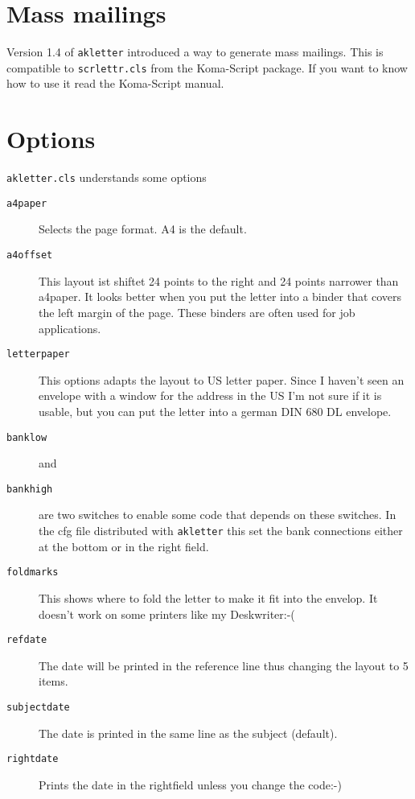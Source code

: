 \documentclass[a4paper]{article}
\begin{document}
\section{Mass mailings}

Version 1.4 of \texttt{akletter} introduced a way to generate 
mass mailings. This is compatible to \texttt{scrlettr.cls} from the 
Koma-Script package. If you want to know how to use it read the 
Koma-Script manual.

\section{Options}

\texttt{akletter.cls} understands some options

\begin{description}
\item [\texttt{a4paper}] Selects the page format. A4 is the default.

\item [\texttt{a4offset}] This layout ist shiftet 24 points to the 
right and 24 points narrower than a4paper. It looks better when you 
put the letter into a binder that covers the left margin of the page. 
These binders are often used for job applications.

\item [\texttt{letterpaper}] This options adapts the layout to US 
letter paper. Since I haven't seen an envelope with a window for the 
address in the US I'm not sure if it is usable, but you can put the 
letter into a german DIN 680 DL envelope.

\item [\texttt{banklow}] and
\item [\texttt{bankhigh}] are two switches to enable some code that
depends on these switches. In the cfg file distributed with
\texttt{akletter} this set the bank connections either at the bottom
or in the right field.

\item [\texttt{foldmarks}] This shows where to fold the letter to make
it fit into the envelop. It doesn't work on some printers like my
Deskwriter:-(

\item [\texttt{refdate}] The date will be printed in the reference
line thus changing the layout to 5 items.

\item [\texttt{subjectdate}] The date is printed in the same line as
the subject (default).

\item [\texttt{rightdate}] Prints the date in the rightfield unless
you change the code:-)

\end{description}
\end{document}
